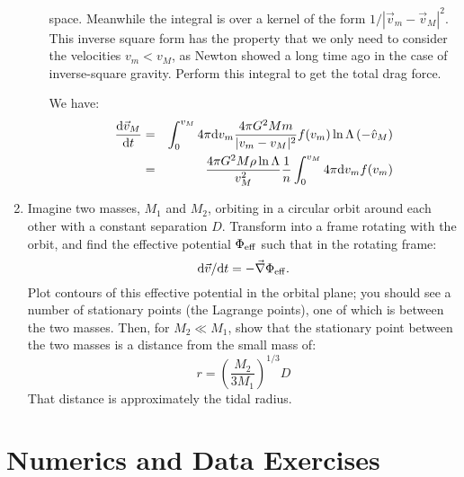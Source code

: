 \begin{enumerate}
\begin{enumerate}
space. Meanwhile the integral is over a kernel of the form
$1/|\vec{v}_m - \vec{v}_M|^2$. This inverse square form has the
property that we only need to consider the velocities $v_m < v_M$, as
Newton showed a long time ago in the case of inverse-square
gravity. Perform this integral to get the total drag force.
\begin{answer}
We have:
\begin{eqnarray}
\frac{{\rm d}\vec{v}_M}{{\rm d}t} &=&
\int_0^{v_M} 4\pi {\rm d}v_m
\frac{4\pi G^2 M m}{|v_m - v_M|^2} f(v_m) \ln \Lambda 
\left(- {\hat v}_M\right)\cr
&=&
\frac{4\pi G^2 M \rho \ln \Lambda}{v_M^2}
\frac{1}{n} \int_0^{v_M} 4\pi {\rm d}v_m f(v_m)
\end{eqnarray}
\end{answer}
\end{enumerate}
\item Imagine two masses, $M_1$ and $M_2$, orbiting in a circular
orbit around each other with a constant separation $D$. Transform into
a frame rotating with the orbit, and find the effective potential
$\Phi_{\rm eff}$ such that in the rotating frame:
\begin{equation}
{\rm d}\vec{v}/{\rm d}t = - \vec{\nabla}\Phi_{\rm eff}.
\end{equation}
Plot contours of this effective potential in the orbital plane; you
should see a number of stationary points (the Lagrange points), one of
which is between the two masses. Then, for $M_2\ll M_1$, show that the
stationary point between the two masses is a distance from the small
mass of:
\begin{equation}
r = \left(\frac{M_2}{3M_1}\right)^{1/3} D
\end{equation}
That distance is approximately the tidal radius.
\end{enumerate}

\section{Numerics and Data Exercises}

